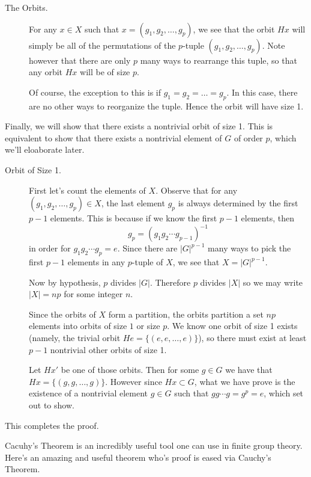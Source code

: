 \documentclass[12pt,letterpaper]{algebra_book}
\theoremstyle{definition}
\begin{document}
\begin{prf}
        \begin{description}
            \item[The Orbits.] 
            For any $x \in X$ such that $x = (g_1, g_2, \dots, g_p)$,
            we see that the orbit $Hx$ will simply be all of
            the permutations of the $p$-tuple $(g_1, g_2, \dots,
            g_p)$. Note however that there are only $p$ many ways to
            rearrange this tuple, so that any orbit $Hx$ will be of
            size $p$.

            Of course, the exception to this is if $g_1 = g_2 = \dots = g_p$. In
            this case, there are no other ways to reorganize the
            tuple. Hence the orbit will have size 1.
        \end{description}

        \textcolor{NavyBlue}{Finally, we will show that there exists a
        nontrivial orbit of size 1. This is equivalent to show that
        there exists a nontrivial element of $G$ of order $p$, which
        we'll eloaborate later.}

        \begin{description}
            \item[Orbit of Size 1.]
            First let's count the elements of $X$. Observe that for
            any $(g_1, g_2, \dots, g_p) \in
            X$, the last element $g_p$ is always determined by the
            first $p-1$ elements. This is because if we know the first
            $p-1$ elements, then 
            \[
                g_p = (g_1g_2 \cdots g_{p-1})^{-1}
            \]
            in order for $g_1g_2\cdots g_p = e$. Since there are
            $|G|^{p-1}$ many ways to pick the first $p-1$ elements in
            any $p$-tuple of $X$, we see that $X = |G|^{p-1}$. 

            Now by hypothesis, $p$ divides $|G|$. Therefore $p$
            divides $|X|$ so we may write $|X| = np$ for some integer $n$.

            Since the orbits of $X$ form a partition, the orbits
            partition a set $np$ elements into orbits of size $1$ or
            size $p$. We know one orbit of size 1 exists (namely, the
            trivial orbit $He = \{(e, e, \dots, e)\}$), so there must
            exist at least $p-1$ nontrivial other orbits of size 1. 

            Let $Hx'$ be one of those orbits. Then for some $g \in G$
            we have that $Hx = \{(g, g, \dots, g)\}$. However since
            $Hx \subset G$, what we have prove is the existence of a
            nontrivial
            element $g \in G$ such that $gg\cdots g = g^p = e$, which
           set out to show.
        \end{description}
        This completes the proof.
    \end{prf}
    Cacuhy's Theorem is an incredibly useful tool one can use in
    finite group theory. Here's an amazing and useful theorem who's
    proof is eased via Cauchy's Theorem.
\end{document}
